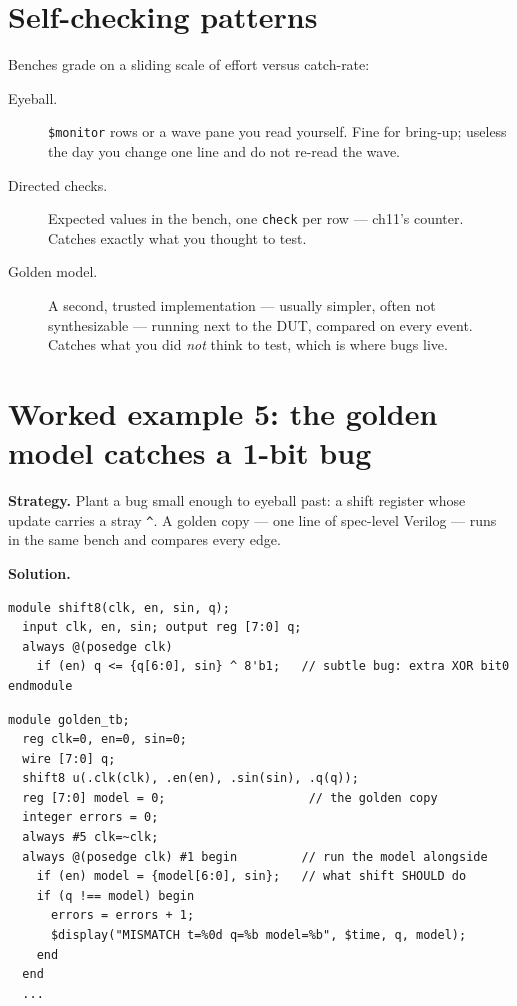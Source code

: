 \section{Self-checking patterns}\label{sec:selfcheck}

Benches grade on a sliding scale of
effort versus catch-rate:

\begin{description}
\item[Eyeball.] \texttt{\$monitor} rows or a wave pane you read
yourself. Fine for bring-up; useless the day you change one line and
do not re-read the wave.
\item[Directed checks.] Expected values in the bench, one
\texttt{check} per row --- ch11's counter. Catches exactly what you
thought to test.
\item[Golden model.] A second, trusted implementation --- usually
simpler, often not synthesizable --- running next to the DUT,
compared on every event. Catches what you did \emph{not} think to
test, which is where bugs live.
\end{description}

\section{Worked example 5: the golden model catches a 1-bit bug}
\label{sec:we-golden}

\textbf{Strategy.} Plant a bug small enough to eyeball past: a shift
register whose update carries a stray \texttt{\^{}}. A golden copy
--- one line of spec-level Verilog --- runs in the same bench and
compares every edge.

\textbf{Solution.}
\begin{lstlisting}[caption={\ttfamily code/ch12\_shift.v --- spot the
bug; the model does not care that you can't.},label={lst:shift}]
module shift8(clk, en, sin, q);
  input clk, en, sin; output reg [7:0] q;
  always @(posedge clk)
    if (en) q <= {q[6:0], sin} ^ 8'b1;   // subtle bug: extra XOR bit0
endmodule
\end{lstlisting}

\begin{lstlisting}[caption={\ttfamily code/ch12\_golden\_tb.v
(abridged) --- the spec runs inside the bench. Notice
\texttt{\#1}: read the DUT \emph{after} the edge settles, the
\texttt{negedge}-style discipline of \S\ref{sec:race}.},
label={lst:golden}]
module golden_tb;
  reg clk=0, en=0, sin=0;
  wire [7:0] q;
  shift8 u(.clk(clk), .en(en), .sin(sin), .q(q));
  reg [7:0] model = 0;                    // the golden copy
  integer errors = 0;
  always #5 clk=~clk;
  always @(posedge clk) #1 begin         // run the model alongside
    if (en) model = {model[6:0], sin};   // what shift SHOULD do
    if (q !== model) begin
      errors = errors + 1;
      $display("MISMATCH t=%0d q=%b model=%b", $time, q, model);
    end
  end
  ...
\end{lstlisting}

